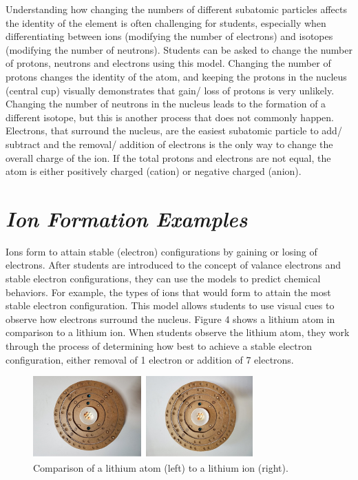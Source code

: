 \documentclass[11pt]{sig-alternate}
\begin{document}
\begin{large}
Understanding how changing the numbers of different subatomic particles affects the identity of the element is often challenging for students, especially when differentiating between ions (modifying the number of electrons) and isotopes (modifying the number of neutrons).  Students can be asked to change the number of protons, neutrons and electrons using this model.  Changing the number of protons changes the identity of the atom, and keeping the protons in the nucleus (central cup) visually demonstrates that gain/ loss of protons is very unlikely.  Changing the number of neutrons in the nucleus leads to the formation of a different isotope, but this is another process that does not commonly happen.  Electrons, that surround the nucleus, are the easiest subatomic particle to add/ subtract and the removal/ addition of electrons is the only way to change the overall charge of the ion. If the total protons and electrons are not equal, the atom is either positively charged (cation) or negative charged (anion).
\section*{\textit{Ion Formation Examples}}
 
Ions form to attain stable (electron) configurations by gaining or losing of electrons.  After students are introduced to the concept of valance electrons and stable electron configurations, they can use the models to predict chemical behaviors.  For example, the types of ions that would form to attain the most stable electron configuration.  This model allows students to use visual cues to observe how electrons surround the nucleus.
Figure 4 shows a lithium atom in comparison to a lithium ion.  When students observe the lithium atom, they work through the process of determining how best to achieve a stable electron configuration, either removal of 1 electron or addition of 7 electrons.

\begin{figure}[htp]
    \centering
    \includegraphics[width=8.5cm]{Figure4.png}
    \caption{Comparison of a lithium atom (left) to a lithium ion (right).}
    \label{Comparison of a lithium atom (left) to a lithium ion (right).}
    \label{Figure shows 3D cardboard Bohr models showing different ions of Lithium. The different ions are indicated by the number of blue marbles placed within the model. The image on the left has one additional blue marble compared to the one on the right.}
\end{figure}


\end{large}
\end{document}
